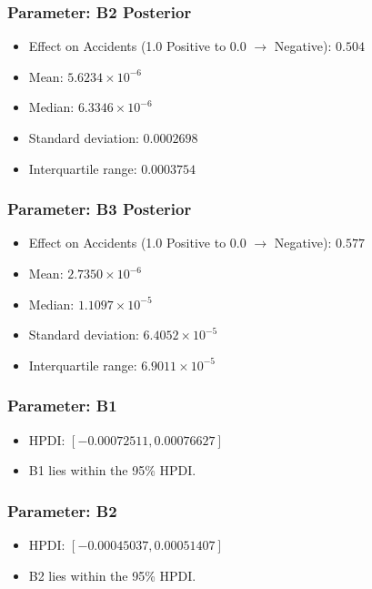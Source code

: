 \documentclass{article}
\begin{document}
\subsubsection{Parameter: B2 Posterior}
\begin{itemize}
    \item Effect on Accidents (1.0 Positive to 0.0 $\rightarrow$ Negative): $0.504$
    \item Mean: $5.6234 \times 10^{-6}$
    \item Median: $6.3346 \times 10^{-6}$
    \item Standard deviation: $0.0002698$
    \item Interquartile range: $0.0003754$
\end{itemize}

\subsubsection{Parameter: B3 Posterior}
\begin{itemize}
    \item Effect on Accidents (1.0 Positive to 0.0 $\rightarrow$ Negative): $0.577$
    \item Mean: $2.7350 \times 10^{-6}$
    \item Median: $1.1097 \times 10^{-5}$
    \item Standard deviation: $6.4052 \times 10^{-5}$
    \item Interquartile range: $6.9011 \times 10^{-5}$
\end{itemize}

\subsubsection{Parameter: B1}
\begin{itemize}
    \item HPDI: $[-0.00072511, 0.00076627]$
    \item B1 lies within the 95\% HPDI.
\end{itemize}

\subsubsection{Parameter: B2}
\begin{itemize}
    \item HPDI: $[-0.00045037, 0.00051407]$
    \item B2 lies within the 95\% HPDI.
\end{itemize}
\end{document}
